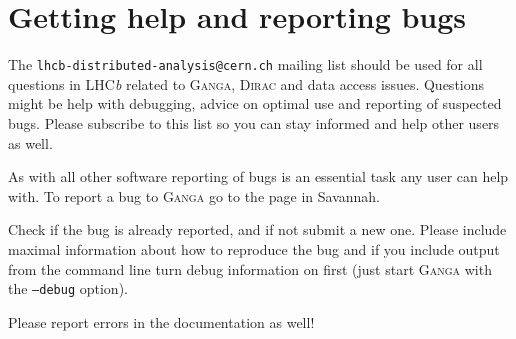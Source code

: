 \documentclass{howto}
\def\ganga {\textsc{Ganga}\xspace}
\def\lhcb {LHC{\em b\/}\xspace}
\def\dirac {\textsc{Dirac}\xspace}
\begin{document}
\section{Getting help and reporting bugs}
The \texttt{lhcb-distributed-analysis@cern.ch} mailing list should be used for
all questions in \lhcb related to \ganga, \dirac and data access issues.
Questions might be help with debugging, advice on optimal use and reporting of
suspected bugs. Please subscribe to this list so you can stay informed and
help other users as well.

As with all other software reporting of bugs is an essential task any user can
help with. To report a bug to \ganga go to the page in Savannah.
\begin{seealso}
\end{seealso}
Check if the bug is already reported, and if not submit a new one. Please
include maximal information about how to reproduce the bug and if you include
output from the command line turn debug information on first (just start
\ganga with the \texttt{--debug} option).

Please report errors in the documentation as well!
\end{document}
